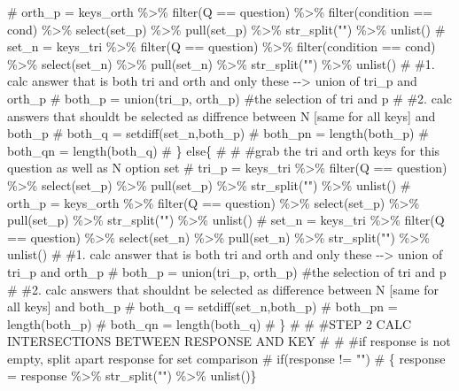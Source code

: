 \documentclass[
  letterpaper,
  DIV=11,
  numbers=noendperiod]{scrreprt}
\newenvironment{Shaded}{\begin{snugshade}}{\end{snugshade}}
\newcommand{\CommentTok}[1]{\textcolor[rgb]{0.37,0.37,0.37}{#1}}
\begin{document}
\begin{Shaded}
\begin{Highlighting}[]
\CommentTok{\#      orth\_p = keys\_orth \%\textgreater{}\% filter(Q == question) \%\textgreater{}\% filter(condition == cond) \%\textgreater{}\% select(set\_p) \%\textgreater{}\% pull(set\_p) \%\textgreater{}\% str\_split("") \%\textgreater{}\% unlist()}
\CommentTok{\#      set\_n =  keys\_tri \%\textgreater{}\%  filter(Q == question) \%\textgreater{}\% filter(condition == cond) \%\textgreater{}\% select(set\_n) \%\textgreater{}\% pull(set\_n) \%\textgreater{}\% str\_split("") \%\textgreater{}\% unlist() }
\CommentTok{\#      \#1. calc answer that is both tri and orth and only these {-}{-}\textgreater{} union of tri\_p and orth\_p}
\CommentTok{\#      both\_p = union(tri\_p, orth\_p) \#the selection of tri and p}
\CommentTok{\#      \#2. calc answers that should\textquotesingle{}t be selected as diffrence between N [same for all keys] and both\_p}
\CommentTok{\#      both\_q = setdiff(set\_n,both\_p)}
\CommentTok{\#      both\_pn = length(both\_p)}
\CommentTok{\#      both\_qn = length(both\_q)}
\CommentTok{\#   \} else\{}
\CommentTok{\#     }
\CommentTok{\#      \#grab the tri and orth keys for this question as well as N option set}
\CommentTok{\#      tri\_p =  keys\_tri \%\textgreater{}\%  filter(Q == question) \%\textgreater{}\% select(set\_p) \%\textgreater{}\% pull(set\_p) \%\textgreater{}\% str\_split("") \%\textgreater{}\% unlist()}
\CommentTok{\#      orth\_p = keys\_orth \%\textgreater{}\% filter(Q == question) \%\textgreater{}\% select(set\_p) \%\textgreater{}\% pull(set\_p) \%\textgreater{}\% str\_split("") \%\textgreater{}\% unlist()}
\CommentTok{\#      set\_n =  keys\_tri \%\textgreater{}\%  filter(Q == question) \%\textgreater{}\% select(set\_n) \%\textgreater{}\% pull(set\_n) \%\textgreater{}\% str\_split("") \%\textgreater{}\% unlist() }
\CommentTok{\#      \#1. calc answer that is both tri and orth and only these {-}{-}\textgreater{} union of tri\_p and orth\_p}
\CommentTok{\#      both\_p = union(tri\_p, orth\_p) \#the selection of tri and p}
\CommentTok{\#      \#2. calc answers that shouldn\textquotesingle{}t be selected as difference between N [same for all keys] and both\_p}
\CommentTok{\#      both\_q = setdiff(set\_n,both\_p)}
\CommentTok{\#      both\_pn = length(both\_p)}
\CommentTok{\#      both\_qn = length(both\_q)}
\CommentTok{\#   \}}
\CommentTok{\#     }
\CommentTok{\#   \#STEP 2 CALC INTERSECTIONS BETWEEN RESPONSE AND KEY}
\CommentTok{\#   }
\CommentTok{\#   \#if response is not empty, split apart response for set comparison}
\CommentTok{\#     if(response != "")}
\CommentTok{\#     \{ response = response \%\textgreater{}\% str\_split("") \%\textgreater{}\% unlist()\}}

\end{Highlighting}
\end{Shaded}
\end{document}
